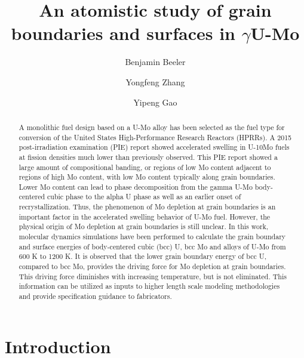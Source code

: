 \documentclass[review]{elsarticle}
\begin{document}
\begin{frontmatter}
\title{An atomistic study of grain boundaries and surfaces in $\gamma$U-Mo}

\author[inl]{Benjamin Beeler}
\author[inl]{Yongfeng Zhang}
\author[inl]{Yipeng Gao}
\address[inl]{Idaho National Laboratory, Idaho Falls, ID 83415}


\begin{abstract}
A monolithic fuel design based on a U-Mo alloy has been selected as the fuel type for conversion of the United States High-Performance Research Reactors (HPRRs). A 2015 post-irradiation examination (PIE) report showed accelerated swelling in U-10Mo fuels at fission densities much lower than previously observed. This PIE report showed a large amount of compositional banding, or regions of low Mo content adjacent to regions of high Mo content, with low Mo content typically along grain boundaries. Lower Mo content can lead to phase decomposition from the gamma U-Mo body-centered cubic phase to the alpha U phase as well as an earlier onset of recrystallization. Thus, the phenomenon of Mo depletion at grain boundaries is an important factor in the accelerated swelling behavior of U-Mo fuel. However, the physical origin of Mo depletion at grain boundaries is still unclear. In this work, molecular dynamics simulations have been performed to calculate the grain boundary and surface energies of body-centered cubic (bcc) U, bcc Mo and alloys of U-Mo from 600 K to 1200 K. It is observed that the lower grain boundary energy of bcc U, compared to bcc Mo, provides the driving force for Mo depletion at grain boundaries. This driving force diminishes with increasing temperature, but is not eliminated. This information can be utilized as inputs to higher length scale modeling methodologies and provide specification guidance to fabricators.
\end{abstract}
\end{frontmatter}

\linenumbers
\modulolinenumbers[5]

\section{Introduction}
\end{document}
